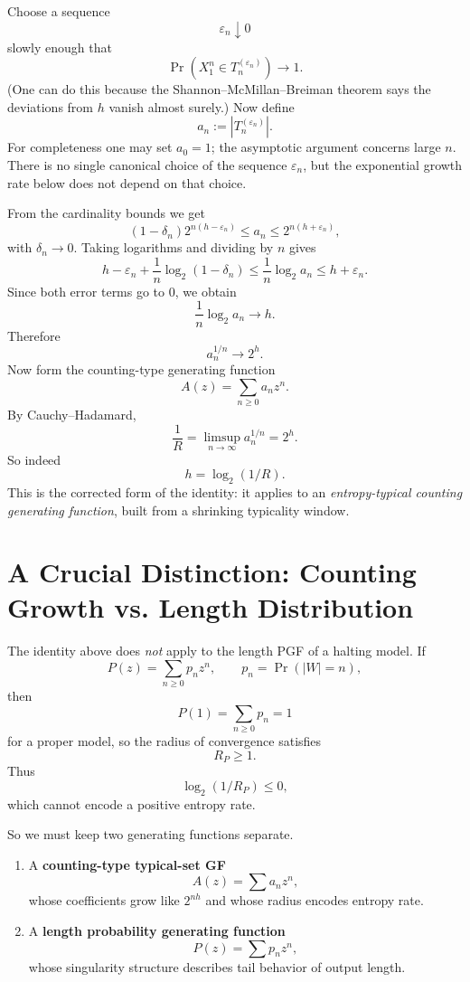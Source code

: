 Choose a sequence
\[
  \varepsilon_n \downarrow 0
\]
slowly enough that
\[
  \Pr(X_1^n \in T_n^{(\varepsilon_n)}) \to 1.
\]
(One can do this because the Shannon--McMillan--Breiman theorem says the deviations from $h$ vanish almost surely.) Now define
\[
  a_n := \left|T_n^{(\varepsilon_n)}\right|.
\]
For completeness one may set $a_0=1$; the asymptotic argument concerns large $n$.
There is no single canonical choice of the sequence $\varepsilon_n$, but the exponential growth rate below does not depend on that choice.

From the cardinality bounds we get
\[
  (1-\delta_n)2^{n(h-\varepsilon_n)} \le a_n \le 2^{n(h+\varepsilon_n)},
\]
with $\delta_n \to 0$. Taking logarithms and dividing by $n$ gives
\[
  h-\varepsilon_n + \frac{1}{n}\log_2(1-\delta_n) \le \frac{1}{n}\log_2 a_n \le h+\varepsilon_n.
\]
Since both error terms go to $0$, we obtain
\[
  \frac{1}{n}\log_2 a_n \to h.
\]
Therefore
\[
  a_n^{1/n} \to 2^h.
\]
Now form the counting-type generating function
\[
  A(z) = \sum_{n \ge 0} a_n z^n.
\]
By Cauchy--Hadamard,
\[
  \frac{1}{R} = \limsup_{n \to \infty} a_n^{1/n} = 2^h.
\]
So indeed
\[
  h = \log_2(1/R).
\]
This is the corrected form of the identity: it applies to an \emph{entropy-typical counting generating function}, built from a shrinking typicality window.

\section{A Crucial Distinction: Counting Growth vs. Length Distribution}

The identity above does \emph{not} apply to the length PGF of a halting model. If
\[
  P(z) = \sum_{n \ge 0} p_n z^n,
  \qquad p_n = \Pr(|W|=n),
\]
then
\[
  P(1)=\sum_{n \ge 0} p_n = 1
\]
for a proper model, so the radius of convergence satisfies
\[
  R_P \ge 1.
\]
Thus
\[
  \log_2(1/R_P) \le 0,
\]
which cannot encode a positive entropy rate.

So we must keep two generating functions separate.
\begin{enumerate}
  \item A \textbf{counting-type typical-set GF}
  \[
    A(z)=\sum a_n z^n,
  \]
  whose coefficients grow like $2^{nh}$ and whose radius encodes entropy rate.
  \item A \textbf{length probability generating function}
  \[
    P(z)=\sum p_n z^n,
  \]
  whose singularity structure describes tail behavior of output length.
\end{enumerate}

